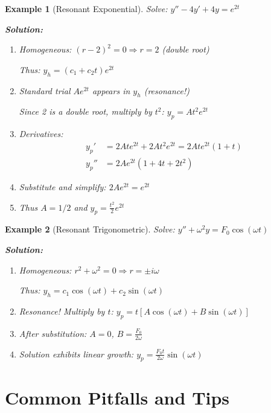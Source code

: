 \documentclass[12pt]{article}
\newtheorem{example}{Example}
\begin{document}
\begin{example}[Resonant Exponential]
Solve: $y'' - 4y' + 4y = e^{2t}$

\textbf{Solution:}
\begin{enumerate}
    \item Homogeneous: $(r-2)^2 = 0 \Rightarrow r = 2$ (double root)

    Thus: $y_h = (c_1 + c_2 t)e^{2t}$

    \item Standard trial $Ae^{2t}$ appears in $y_h$ (resonance!)

    Since 2 is a double root, multiply by $t^2$: $y_p = At^2 e^{2t}$

    \item Derivatives:
    \begin{align}
    y_p' &= 2Ate^{2t} + 2At^2e^{2t} = 2Ate^{2t}(1 + t) \\
    y_p'' &= 2Ae^{2t}(1 + 4t + 2t^2)
    \end{align}

    \item Substitute and simplify: $2Ae^{2t} = e^{2t}$

    \item Thus $A = 1/2$ and $y_p = \frac{t^2}{2}e^{2t}$
\end{enumerate}
\end{example}

\begin{example}[Resonant Trigonometric]
Solve: $y'' + \omega^2 y = F_0 \cos(\omega t)$

\textbf{Solution:}
\begin{enumerate}
    \item Homogeneous: $r^2 + \omega^2 = 0 \Rightarrow r = \pm i\omega$

    Thus: $y_h = c_1 \cos(\omega t) + c_2 \sin(\omega t)$

    \item Resonance! Multiply by $t$: $y_p = t[A\cos(\omega t) + B\sin(\omega t)]$

    \item After substitution: $A = 0$, $B = \frac{F_0}{2\omega}$

    \item Solution exhibits linear growth: $y_p = \frac{F_0 t}{2\omega}\sin(\omega t)$
\end{enumerate}
\end{example}

\section{Common Pitfalls and Tips}
\end{document}
